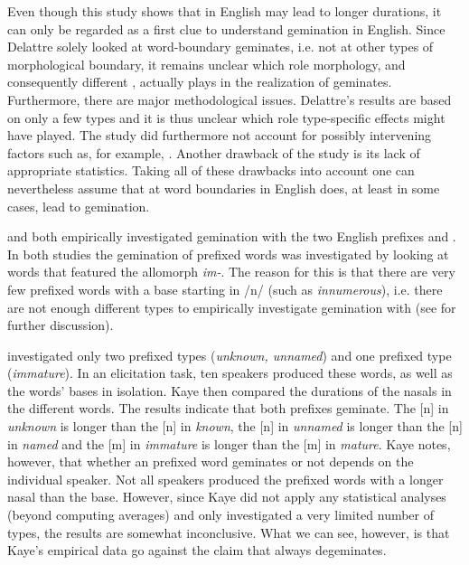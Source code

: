 Even though this study shows that  in English may lead to longer durations, it can only be regarded as a first clue to understand gemination in English. Since Delattre solely looked at word-boundary geminates, i.e. not at other types of morphological boundary, it remains unclear which role morphology, and consequently different , actually plays in the realization of geminates. Furthermore, there are major methodological issues. Delattre's results are based on only a few types and it is thus unclear which role type-specific effects might have played. The study did furthermore not account for possibly intervening factors such as, for example, . Another drawback of the study is its lack of appropriate statistics. Taking all of these drawbacks into account one can nevertheless assume that  at word boundaries in English does, at least in some cases, lead to gemination.


\citet{Kaye.2005} and \citet{Oh.2012} both empirically investigated gemination with the two English prefixes  and . In both studies the gemination of prefixed words was investigated by looking at words that featured the allomorph \textit{im-}. The reason for this is that there are very few prefixed words with a base starting in /n/ (such as \textit{innumerous}), i.e. there are not enough different types to empirically investigate gemination with  (see  for further discussion). 


\cite{Kaye.2005} investigated  only two prefixed types (\textit{unknown, unnamed}) and one  prefixed type (\textit{immature}). In an elicitation task, ten speakers produced these words, as well as the words’ bases in isolation. Kaye then compared the durations of the nasals in the different words. The results indicate that both prefixes geminate. The [n] in \textit{unknown} is longer than the [n] in \textit{known},  the [n] in \textit{unnamed} is longer than the [n] in \textit{named} and the [m] in \textit{immature} is longer than the [m] in \textit{mature}. Kaye notes, however, that whether an prefixed word geminates or not depends  on the individual speaker. Not all speakers produced the prefixed words with a longer nasal than the base. However, since Kaye did not apply any statistical analyses (beyond computing averages) and only investigated a very limited number of types, the results are somewhat inconclusive. What we can see, however, is that Kaye's empirical data go against the claim that  always {degeminates}.


